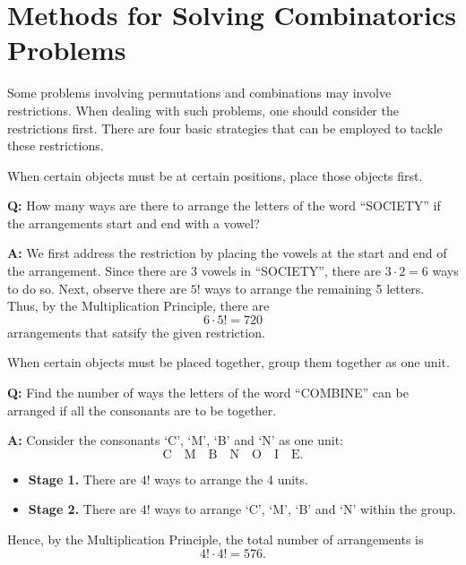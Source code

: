 \section{Methods for Solving Combinatorics Problems}

Some problems involving permutations and combinations may involve restrictions. When dealing with such problems, one should consider the restrictions first. There are four basic strategies that can be employed to tackle these restrictions.

\begin{method}
    When certain objects must be at certain positions, place those objects first.
\end{method}

\begin{example}
    \phantom{.}
    
    \textbf{Q:} How many ways are there to arrange the letters of the word ``SOCIETY'' if the arrangements start and end with a vowel?
    
    \textbf{A:} We first address the restriction by placing the vowels at the start and end of the arrangement. Since there are 3 vowels in ``SOCIETY'', there are $3 \cdot 2 = 6$ ways to do so. Next, observe there are $5!$ ways to arrange the remaining 5 letters. Thus, by the Multiplication Principle, there are \[6 \cdot 5! = 720\] arrangements that satsify the given restriction.
\end{example}

\begin{method}
    When certain objects must be placed together, group them together as one unit.
\end{method}

\begin{example}
    \phantom{.}

    \textbf{Q:} Find the number of ways the letters of the word ``COMBINE'' can be arranged if all the consonants are to be together.

    \textbf{A:} Consider the consonants `C', `M', `B' and `N' as one unit: \[\boxed{\text{C} \quad \text{M} \quad \text{B} \quad \text{N}} \quad \boxed{\text{O}} \quad \boxed{\text{I}} \quad \boxed{\text{E}}.\]
    \begin{itemize}
        \item \textbf{Stage 1.} There are $4!$ ways to arrange the 4 units.
        \item \textbf{Stage 2.} There are $4!$ ways to arrange `C', `M', `B' and `N' within the group.
    \end{itemize}
    Hence, by the Multiplication Principle, the total number of arrangements is \[4! \cdot 4! = 576.\]
\end{example}

